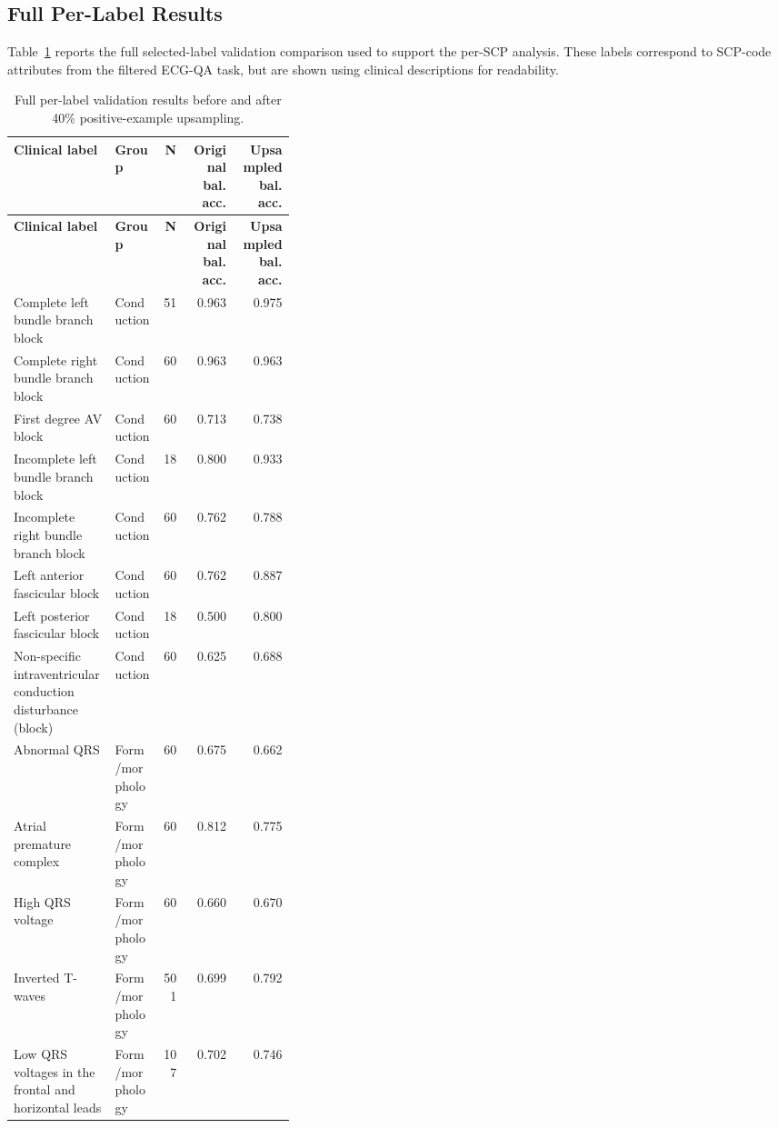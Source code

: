 \subsection{Full Per-Label Results}
\label{app:full_per_scp_results}

Table~\ref{tab:appendix_full_per_scp_results} reports the full selected-label validation comparison used to support the per-SCP analysis. These labels correspond to SCP-code attributes from the filtered ECG-QA task, but are shown using clinical descriptions for readability.

\small
\begin{longtable}{p{0.36\linewidth}lrrr}
\caption{Full per-label validation results before and after 40\% positive-example upsampling.}\label{tab:appendix_full_per_scp_results}\\
\hline
\textbf{Clinical label} & \textbf{Group} & \textbf{N} & \textbf{Original bal. acc.} & \textbf{Upsampled bal. acc.} \\
\hline
\endfirsthead
\hline
\textbf{Clinical label} & \textbf{Group} & \textbf{N} & \textbf{Original bal. acc.} & \textbf{Upsampled bal. acc.} \\
\hline
\endhead
Complete left bundle branch block & Conduction & 51 & 0.963 & 0.975 \\
Complete right bundle branch block & Conduction & 60 & 0.963 & 0.963 \\
First degree AV block & Conduction & 60 & 0.713 & 0.738 \\
Incomplete left bundle branch block & Conduction & 18 & 0.800 & 0.933 \\
Incomplete right bundle branch block & Conduction & 60 & 0.762 & 0.788 \\
Left anterior fascicular block & Conduction & 60 & 0.762 & 0.887 \\
Left posterior fascicular block & Conduction & 18 & 0.500 & 0.800 \\
Non-specific intraventricular conduction disturbance (block) & Conduction & 60 & 0.625 & 0.688 \\
Abnormal QRS & Form/morphology & 60 & 0.675 & 0.662 \\
Atrial premature complex & Form/morphology & 60 & 0.812 & 0.775 \\
High QRS voltage & Form/morphology & 60 & 0.660 & 0.670 \\
Inverted T-waves & Form/morphology & 501 & 0.699 & 0.792 \\
Low QRS voltages in the frontal and horizontal leads & Form/morphology & 107 & 0.702 & 0.746 \\

\end{longtable}
